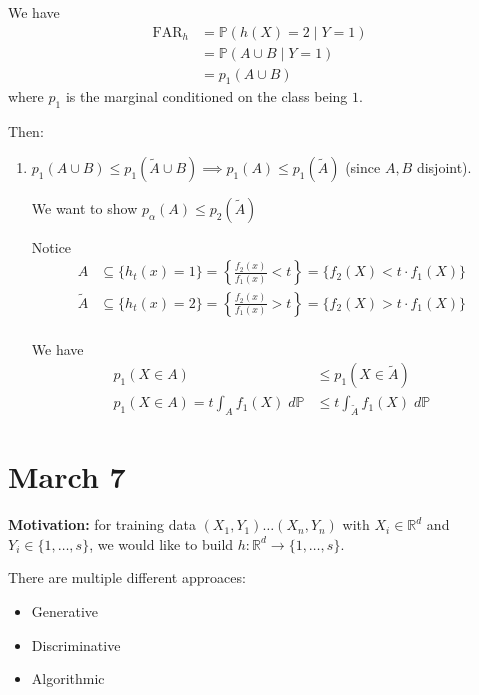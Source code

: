 \documentclass[12pt]{report}
\renewcommand{\P}{\mathbb{P}}
\newcommand{\R}{\mathbb{R}}
\newcommand{\sub}{\subseteq}
\newcommand*{\tbf}[1]{\ifmmode\mathbf{#1}\else\textbf{#1}\fi}
\newenvironment*{tbox}[2][gray]{
    \begin{tcolorbox}[
        parbox=false,
        colback=#1!5!white,
        colframe=#1!75!black,
        breakable,
        title={#2}
    ]}
    {\end{tcolorbox}}
\begin{document}
\begin{tbox}{\textbf{Theorem:} Fix $t \in (0, \infty)$. Let $h$ be any other classifier. If $\text{FAR}_h \leq \text{FAR}_{h_t}$, then $\text{DR}_h \leq \text{DR}_{h_t}$}
    We have
    \begin{align*}
        \text{FAR}_h & = \P(h(X) = 2 \; | \; Y=1)   \\
                     & = \P(A \cup B \; | \; Y = 1) \\
                     & = p_1(A \cup B)
    \end{align*}
    where $p_1$ is the marginal conditioned on the class being $1$.

    Then:
    \begin{enumerate}
        \item $p_1(A \cup B) \leq p_1(\tilde A \cup B) \implies p_1(A) \leq p_1(\tilde A)$ (since $A, B$ disjoint).

              We want to show $p_{\alpha}(A) \leq p_2(\tilde A)$

              Notice
              \begin{align*}
                  A        & \sub \{h_t(x) = 1\} = \left\{\frac{f_2(x)}{f_1(x)} < t\right\} = \{f_2(X) < t \cdot f_1(X)\} \\
                  \tilde A & \sub \{h_t(x) = 2\} = \left\{\frac{f_2(x)}{f_1(x)} > t\right\} = \{f_2(X) > t \cdot f_1(X)\} \\
              \end{align*}

              We have
              \begin{align*}
                  p_1(X \in A)                         & \leq p_1(X\in \tilde A)             \\
                  p_1(X \in A) = t \int_A f_1(X)\; d\P & \leq t \int_{\tilde A} f_1(X)\; d\P
              \end{align*}
    \end{enumerate}
\end{tbox}

\section{March 7}

\tbf{Motivation:} for training data $(X_1, Y_1) \dots (X_n, Y_n)$ with $X_i \in \R^d$ and $Y_i \in \{1, \dots, s\}$, we would like to build $h: \R^d \to \{1, \dots, s\}$.

There are multiple different approaces:
\begin{itemize}
    \item Generative
    \item Discriminative
    \item Algorithmic
\end{itemize}
\end{document}
